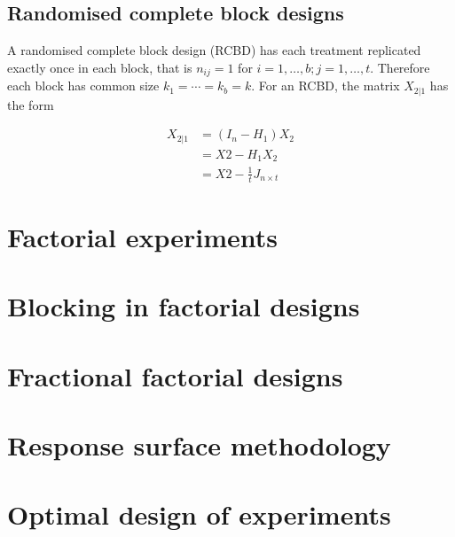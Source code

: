 \documentclass[
]{book}
\theoremstyle{definition}
\theoremstyle{definition}
\theoremstyle{definition}
\theoremstyle{definition}
\theoremstyle{remark}
\begin{document}
\hypertarget{rcdb}{%
\section{Randomised complete block designs}\label{rcdb}}

A randomised complete block design (RCBD) has each treatment replicated exactly once in each block, that is \(n_{ij} = 1\) for \(i=1,\ldots, b; j = 1, \ldots, t\). Therefore each block has common size \(k_1=\cdots =k_b = k\). For an RCBD, the matrix \(X_{2|1}\) has the form

\begin{align*}
X_{2|1} & = (I_n - H_1)X_2 \\
& = X2 - H_1X_2 \\
& = X2 - \frac{1}{t}J_{n \times t}
\end{align*}

\hypertarget{factorial}{%
\chapter{Factorial experiments}\label{factorial}}

\hypertarget{block-factorial}{%
\chapter{Blocking in factorial designs}\label{block-factorial}}

\hypertarget{fractional-factorial}{%
\chapter{Fractional factorial designs}\label{fractional-factorial}}

\hypertarget{response-surface-methodology}{%
\chapter{Response surface methodology}\label{response-surface-methodology}}

\hypertarget{optimal-design-of-experiments}{%
\chapter{Optimal design of experiments}\label{optimal-design-of-experiments}}

  
\end{document}
